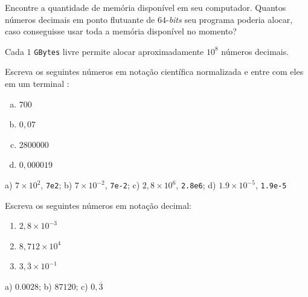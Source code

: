 \begin{exer}
  Encontre a quantidade de memória disponível em seu computador. Quantos números decimais em ponto flutuante de $64$-\textit{bits} seu programa poderia alocar, caso conseguisse usar toda a memória disponível no momento?
\end{exer}
\begin{resp}
  Cada $1$ \texttt{GBytes} livre permite alocar aproximadamente $10^8$ números decimais.
\end{resp}

\begin{exer}
  Escreva os seguintes números em notação científica normalizada e entre com eles em um terminal {\python}:
  \begin{enumerate}[a)]
  \item $700$
  \item $0,07$
  \item $2800000$
  \item $0,000019$
  \end{enumerate}
\end{exer}
\begin{resp}
  a) $7\times 10^2$, \lstinline+7e2+; b) $7\times 10^{-2}$, \lstinline+7e-2+; c) $2,8\times 10^6$, \lstinline+2.8e6+; d) $1.9\times 10^{-5}$, \lstinline+1.9e-5+
\end{resp}

\begin{exer}
  Escreva os seguintes números em notação decimal:
  \begin{enumerate}
  \item $2,8\times 10^{-3}$
  \item $8,712\times 10^4$
  \item $3,\overline{3}\times 10^{-1}$
  \end{enumerate}
\end{exer}
\begin{resp}
  a) $0.0028$; b) $87120$; c) $0,\overline{3}$
\end{resp}

